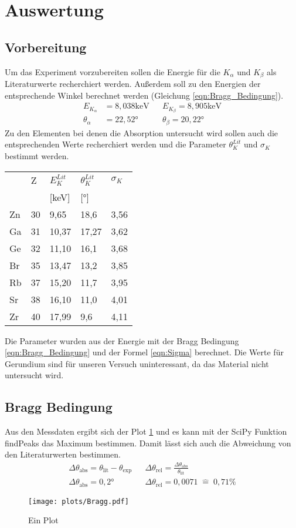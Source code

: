 \section{Auswertung}
\label{sec:Auswertung}
\subsection{Vorbereitung}
Um das Experiment vorzubereiten sollen die Energie für die $K_{\alpha}$ und $K_{\beta}$ als Literaturwerte recherchiert werden.
Außerdem soll zu den Energien der entsprechende Winkel berechnet werden (Gleichung \ref{eqn:Bragg_Bedingung}).
\begin{align}
    E_{K_{\alpha}} &= 8,038 \text{keV} && E_{K_{\beta}} = 8,905 \text{keV} \nonumber \\
    \theta_{\alpha} &= 22,52°    &&      \theta_{\beta} = 20,22° \nonumber
\end{align}
Zu den Elementen bei denen die Absorption untersucht wird sollen auch die entsprechenden Werte recherchiert werden und die Parameter $\theta_K^{Lit}$ und $\sigma_K$ bestimmt werden.
\begin{table}[H]
\centering
\begin{tabular}{lllll}
  & Z & $E_K^{Lit}$ & $\theta_K^{Lit}$ & $\sigma_K$\\
  &   & [keV] & [°] &  \\
  \toprule
Zn & 30 & 9,65 & 18,6 & 3,56\\
\midrule
Ga & 31 & 10,37 & 17,27 & 3,62\\
\midrule
Ge & 32 & 11,10 & 16,1 & 3,68\\ 
\midrule
Br & 35 & 13,47 & 13,2 & 3,85\\ 
\midrule
Rb & 37 & 15,20 & 11,7 & 3,95\\ 
\midrule
Sr & 38 & 16,10 & 11,0 & 4,01\\
\midrule
Zr & 40 & 17,99 & 9,6 & 4,11\\
\bottomrule
\end{tabular}
\end{table}
Die Parameter wurden aus der Energie mit der Bragg Bedingung \ref{eqn:Bragg_Bedingung} und der Formel \ref{eqn:Sigma} berechnet.
Die Werte für Gerundium sind für unseren Versuch uninteressant, da das Material nicht untersucht wird.
\subsection{Bragg Bedingung}
Aus den Messdaten ergibt sich der Plot \ref{fig:Bragg} und es kann mit der SciPy Funktion findPeaks das Maximum bestimmen.
Damit lässt sich auch die Abweichung von den Literaturwerten bestimmen.
\begin{align}
    \Delta \theta_{\text{abs}} = \theta_{\text{lit}}-\theta_{\text{exp}} && \Delta \theta_{\text{rel}} = \frac{\Delta \theta_{\text{abs}}}{\theta_{\text{lit}}}\\
    \Delta \theta_{\text{abs}} = 0,2° &&     \Delta \theta_{\text{rel}} = 0,0071 \; \hat{=} \; 0,71 \% 
\end{align}
\begin{figure}
    \centering
    \texttt{[image: plots/Bragg.pdf]}
    \caption{Ein Plot}
    \label{fig:Bragg}
\end{figure}

